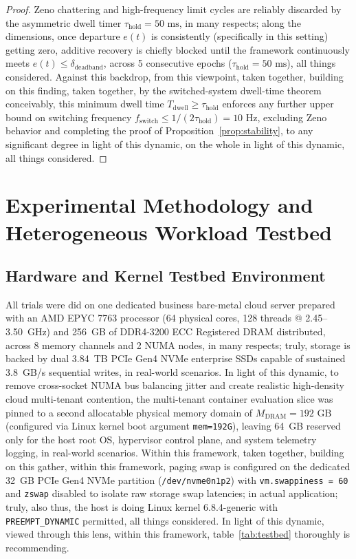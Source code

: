 \documentclass[pdflatex,sn-mathphys,Numbered]{sn-jnl}
\begin{document}
\begin{proof}
Zeno chattering and high-frequency limit cycles are reliably discarded by the asymmetric dwell timer $\tau_{\text{hold}} = 50\text{ ms}$, in many respects; along the dimensions, once departure $e(t)$ is consistently (specifically in this setting) getting zero, additive recovery is chiefly blocked until the framework continuously meets $e(t) \le \delta_{\text{deadband}}$, across 5 consecutive epochs ($\tau_{\text{hold}} = 50\text{ ms}$), all things considered. Against this backdrop, from this viewpoint, taken together, building on this finding, taken together, by the switched-system dwell-time theorem conceivably, this minimum dwell time $T_{\text{dwell}} \ge \tau_{\text{hold}}$ enforces any further upper bound on switching frequency $f_{\text{switch}} \le 1 / (2\tau_{\text{hold}}) = 10\text{ Hz}$, excluding Zeno behavior and completing the proof of Proposition~\ref{prop:stability}, to any significant degree in light of this dynamic, on the whole in light of this dynamic, all things considered.
\end{proof}

\section{Experimental Methodology and Heterogeneous Workload Testbed}
\label{sec:methods}

\subsection{Hardware and Kernel Testbed Environment}
All trials were did on one dedicated business bare-metal cloud server prepared with an AMD EPYC 7763 processor (64 physical cores, 128 threads @ 2.45--3.50~GHz) and 256~GB of DDR4-3200 ECC Registered DRAM distributed, across 8 memory channels and 2 NUMA nodes, in many respects; truly, storage is backed by dual 3.84~TB PCIe Gen4 NVMe enterprise SSDs capable of sustained 3.8~GB/s sequential writes, in real-world scenarios. In light of this dynamic, to remove cross-socket NUMA bus balancing jitter and create realistic high-density cloud multi-tenant contention, the multi-tenant container evaluation slice was pinned to a second allocatable physical memory domain of $M_{\text{DRAM}} = 192\text{ GB}$ (configured via Linux kernel boot argument \texttt{mem=192G}), leaving 64~GB reserved only for the host root OS, hypervisor control plane, and system telemetry logging, in real-world scenarios. Within this framework, taken together, building on this gather, within this framework, paging swap is configured on the dedicated 32~GB PCIe Gen4 NVMe partition (\texttt{/dev/nvme0n1p2}) with \texttt{vm.swappiness = 60} and \texttt{zswap} disabled to isolate raw storage swap latencies; in actual application; truly, also thus, the host is doing Linux kernel 6.8.4-generic with \texttt{PREEMPT\_DYNAMIC} permitted, all things considered. In light of this dynamic, viewed through this lens, within this framework, table~\ref{tab:testbed} thoroughly is recommending.
\end{document}
